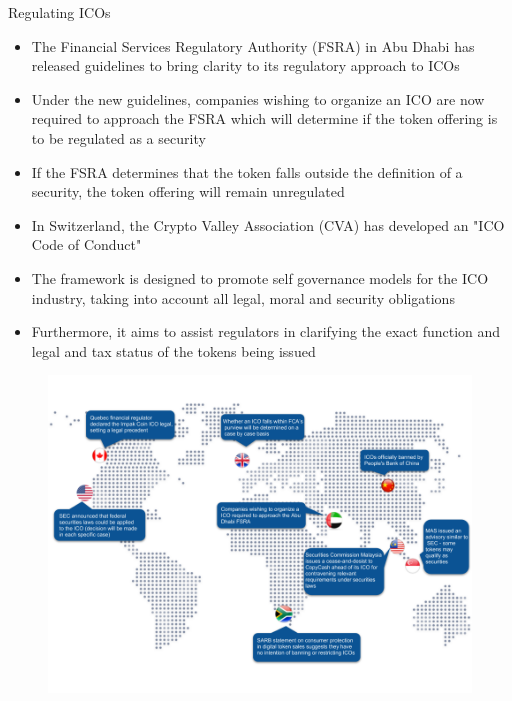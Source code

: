 \documentclass[11pt]{beamer}
\begin{document}

\begin{frame}{Regulating ICOs}
	\begin{itemize}
		\item The Financial Services Regulatory Authority (FSRA) in Abu Dhabi has released guidelines to bring clarity to its regulatory approach to ICOs
		\item Under the new guidelines, companies wishing to organize an ICO are now required to approach the FSRA which will determine if the token offering is to be regulated as a security
		\item If the FSRA determines that the token falls outside the definition of a security, the token offering will remain unregulated
		\item In Switzerland, the Crypto Valley Association (CVA) has developed an "ICO Code of Conduct"
		\item The framework is designed to promote self governance models for the ICO industry, taking into account all legal, moral and security obligations
		\item Furthermore, it aims to assist regulators in clarifying the exact function and legal and tax status of the tokens being issued
	\end{itemize}
\end{frame}



\begin{frame}
	\begin{figure}[]
		\centering
		\includegraphics  [scale=0.3]{Images/ico-map}
	\end{figure}
\end{frame}
\end{document}
